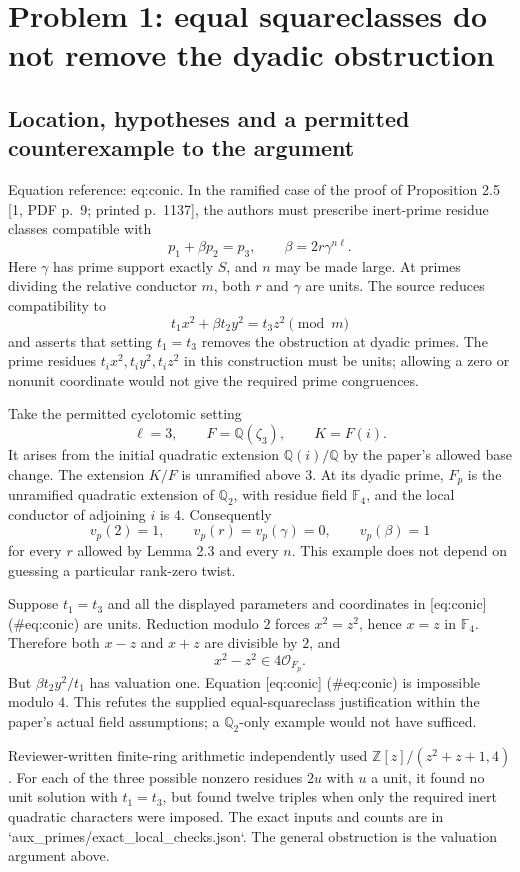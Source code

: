 \documentclass[10pt]{article}
\begin{document}
\section*{Problem 1: equal squareclasses do not remove the dyadic obstruction}
\subsection*{Location, hypotheses and a permitted counterexample to the argument}
Equation reference: eq:conic. In the ramified case of the proof of Proposition 2.5 [1, PDF p. 9; printed p. 1137], the authors must prescribe inert-prime residue classes compatible with \[p_1+\beta p_2=p_3,\qquad \beta=2r\gamma^{n\ell}.\] Here \(\gamma\) has prime support exactly \(S\), and \(n\) may be made large. At primes dividing the relative conductor \(m\), both \(r\) and \(\gamma\) are units. The source reduces compatibility to \[
 t_1x^2+\beta t_2y^2=t_3z^2\pmod{ m}\] and asserts that setting \(t_1=t_3\) removes the obstruction at dyadic primes. The prime residues \(t_ix^2,t_iy^2,t_iz^2\) in this construction must be units; allowing a zero or nonunit coordinate would not give the required prime congruences.\par
Take the permitted cyclotomic setting \[\ell=3,\qquad F=\mathbb Q(\zeta_3),\qquad K=F(i).\] It arises from the initial quadratic extension \(\mathbb Q(i)/\mathbb Q\) by the paper’s allowed base change. The extension \(K/F\) is unramified above \(3\). At its dyadic prime, \(F_{ p}\) is the unramified quadratic extension of \(\mathbb Q_2\), with residue field \(\mathbb F_4\), and the local conductor of adjoining \(i\) is \(4\). Consequently \[v_{ p}(2)=1,\qquad
 v_{ p}(r)=v_{ p}(\gamma)=0,\qquad
 v_{ p}(\beta)=1\] for every \(r\) allowed by Lemma 2.3 and every \(n\). This example does not depend on guessing a particular rank-zero twist.\par
Suppose \(t_1=t_3\) and all the displayed parameters and coordinates in [eq:conic] (\#eq:conic) are units. Reduction modulo \(2\) forces \(x^2=z^2\), hence \(x=z\) in \(\mathbb F_4\). Therefore both \(x-z\) and \(x+z\) are divisible by \(2\), and \[x^2-z^2\in4\mathcal O_{F_{ p}}.\] But \(\beta t_2y^2/t_1\) has valuation one. Equation [eq:conic] (\#eq:conic) is impossible modulo \(4\). This refutes the supplied equal-squareclass justification within the paper’s actual field assumptions; a \(\mathbb Q_2\)-only example would not have sufficed.\par
Reviewer-written finite-ring arithmetic independently used \(\mathbb Z[z]/(z^2+z+1,4)\). For each of the three possible nonzero residues \(2u\) with \(u\) a unit, it found no unit solution with \(t_1=t_3\), but found twelve triples when only the required inert quadratic characters were imposed. The exact inputs and counts are in `aux\_primes/exact\_local\_checks.json`. The general obstruction is the valuation argument above.\par
\end{document}
